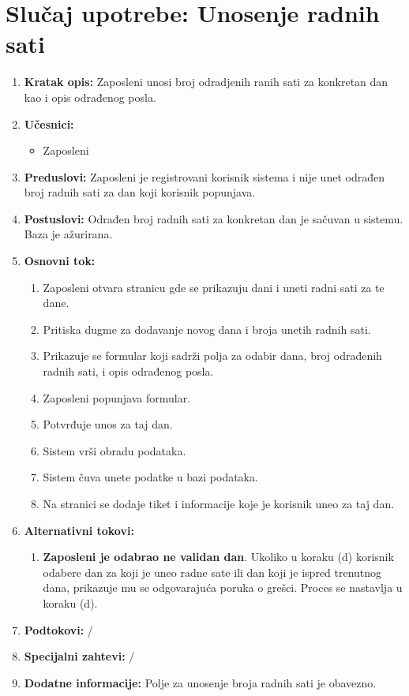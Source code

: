 \documentclass[a4paper]{article}
\begin{document}
\section{Slučaj upotrebe: Unosenje radnih sati}
\begin{enumerate}
    \item \textbf{Kratak opis:} Zaposleni unosi broj odradjenih ranih sati za konkretan dan kao i opis odrađenog posla.
    \item \textbf{Učesnici:}
        \begin{itemize}
            \item Zaposleni
        \end{itemize}
    \item \textbf{Preduslovi:} Zaposleni je registrovani korisnik sistema i nije unet odrađen broj radnih sati za dan koji korisnik popunjava.
    \item \textbf{Postuslovi:} Odrađen broj radnih sati za konkretan dan je sačuvan u sistemu. Baza je ažurirana.
    \item \textbf{Osnovni tok:}
        \begin{enumerate}
            \item Zaposleni otvara stranicu gde se prikazuju dani i uneti radni sati za te dane.
            \item Pritiska dugme za dodavanje novog dana i broja unetih radnih sati.
            \item Prikazuje se formular koji sadrži polja za odabir dana, broj odrađenih radnih sati, i opis odrađenog posla.
            \item Zaposleni popunjava formular.
            \item Potvrđuje unos za taj dan.
            \item Sistem vrši obradu podataka.
            \item Sistem čuva unete podatke u bazi podataka.
            \item Na stranici se dodaje tiket i informacije koje je korisnik uneo za taj dan.
        \end{enumerate}
    \item \textbf{Alternativni tokovi:}
        \begin{enumerate}
            \item \textbf{Zaposleni je odabrao ne validan dan}. Ukoliko u koraku (d) korisnik odabere dan za koji je uneo radne sate ili dan koji je ispred trenutnog dana, prikazuje mu se odgovarajuća poruka o grešci. Proces se nastavlja u koraku (d).
        \end{enumerate}
    \item \textbf{Podtokovi:} /
    \item \textbf{Specijalni zahtevi:} /
    \item \textbf{Dodatne informacije:} Polje za unosenje broja radnih sati je obavezno.
\end{enumerate}
\end{document}
